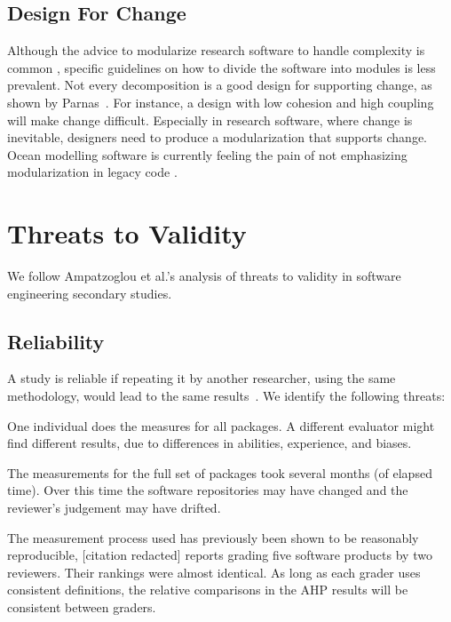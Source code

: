 \documentclass[doubleblind,12pt, 3p, times]{elsarticle}
\begin{document}
\subsection{Design For Change} \label{Sec_DesForChange}

Although the advice to modularize research software to handle
complexity is common \cite{WilsonEtAl2014, StewartEtAl2017, Storer2017},
specific guidelines on how to divide the software into modules is less
prevalent.  Not every decomposition is a good design for supporting change, as
shown by Parnas~\cite{Parnas1972a}.  For instance, a design with low cohesion and high
coupling \cite[p.\ 48]{GhezziEtAl2003} will make change difficult. Especially in
research software, where change is inevitable, designers need to produce a
modularization that supports change.  Ocean modelling software is currently
feeling the pain of not emphasizing modularization in legacy code
\cite{JungEtAl2022}.

\section{Threats to Validity} \label{sec_threats_to_validity}

We follow Ampatzoglou et al.'s \cite{AmpatzoglouEtAl2019} analysis of
threats to validity in software engineering secondary studies.

\subsection{Reliability}

A study is reliable if repeating it by another researcher, using the same
methodology, would lead to the same results~\cite{RunesonAndHost2009}.
We identify the following threats:
\begin{enumerate*}
\item One individual does the measures for all packages. A different
evaluator might find different results, due to differences in abilities,
experience, and biases.
\item The measurements for the full set of packages took several months (of
elapsed time).  Over this time the software repositories may have changed and
the reviewer's judgement may have drifted.
\end{enumerate*}

The measurement process used has previously been shown to be reasonably
reproducible, [citation redacted]
reports grading five software products by two reviewers. Their rankings were
almost identical. As long as each grader uses consistent definitions, the
relative comparisons in the AHP results will be consistent between graders.
\end{document}
